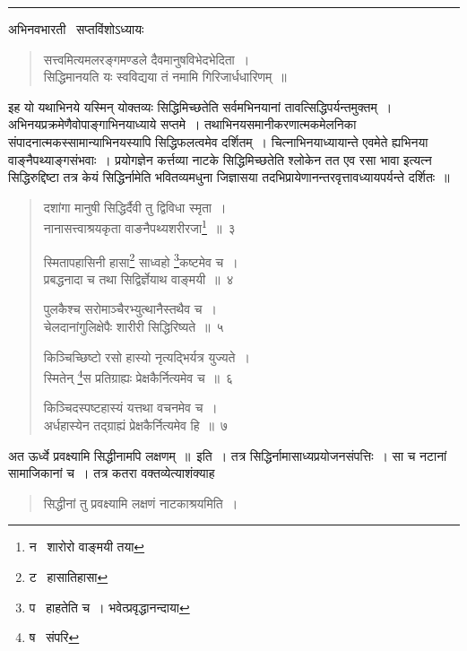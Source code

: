 \documentclass[11pt, openany]{book}
\begin{document}
\hrule

\begin{center}
अभिनवभारती \textendash\ सप्तविंशोऽध्यायः
\end{center}

\begin{quote}
{\qt सत्त्वमित्यमलरङ्गमण्डले दैवमानुषविभेदभेदिता~।\\
सिद्धिमानयति यः स्वविद्यया तं नमामि गिरिजार्धधारिणम्~॥}
\end{quote}

इह यो यथाभिनये यस्मिन् योक्तव्यः सिद्धिमिच्छतेति सर्वमभिनयानां तावत्सिद्धिपर्यन्तमुक्तम्~। अभिनयप्रक्रमेणैवोपाङ्गाभिनयाध्याये सप्तमे~। तथाभिनयसमानीकरणात्मकमेलनिका संपादनात्मकस्सामान्याभिनयस्यापि सिद्धिफलत्वमेव दर्शितम्~। चित्नाभिनयाध्यायान्ते {\qt एवमेते ह्यभिनया वाङ्नैपथ्याङ्गसंभवाः~। प्रयोगज्ञेन कर्त्तव्या नाटके सिद्धिमिच्छतेति} श्लोकेन तत एव रसा भावा इत्यत्न सिद्धिरुद्दिष्टा तत्र केयं सिद्धिर्नामेति भवितव्यमधुना जिज्ञासया तदभिप्रायेणानन्तरवृत्तावध्यायपर्यन्ते दर्शितः~॥

\newpage

\begin{quote}
{\na दशांगा मानुषी सिद्धिर्दैवी तु द्विविधा स्मृता~।\\
नानासत्त्वाश्रयकृता वाङनैपथ्यशरीरजा\renewcommand{\thefootnote}{1}\footnote{न \textendash\  शारोरो वाङ्मयी तया}~॥~३

स्मितापहासिनी हासा\renewcommand{\thefootnote}{2}\footnote{ट \textendash\  हासातिहासा} साध्वहो \renewcommand{\thefootnote}{3}\footnote{प \textendash\  हाहतेति च~। भवेत्प्रवृद्धानन्दाया}कष्टमेव च~।\\
प्रबद्धनादा च तथा सिद्विर्ज्ञेयाथ वाङ्मयी~॥~४

पुलकैश्च सरोमाञ्चैरभ्युत्थानैस्तथैव च~।\\
चेलदानांगुलिक्षेपैः शारीरी सिद्धिरिष्यते~॥~५

किञ्चिच्छिष्टो रसो हास्यो नृत्यद्भिर्यत्र युज्यते~।\\
स्मितेन् \renewcommand{\thefootnote}{4}\footnote{ष \textendash\  संपरि}स प्रतिग्राह्यः प्रेक्षकैर्नित्यमेव च~॥~६

किञ्चिदस्पष्टहास्यं यत्तथा वचनमेव च~।\\
अर्धहास्येन तद्ग्राह्यं प्रेक्षकैर्नित्यमेव हि~॥~७}
\end{quote}

अत ऊर्ध्वे प्रवक्ष्यामि सिद्धीनामपि लक्षणम्~॥~इति~। तत्र सिद्धिर्नामासाध्यप्रयोजनसंपत्तिः~। सा च नटानां सामाजिकानां च~। तत्र कतरा वक्तव्येत्याशंक्याह

\begin{quote}
{\qt सिद्धीनां तु प्रवक्ष्यामि लक्षणं नाटकाश्रयमिति~।}
\end{quote}
\end{document}
